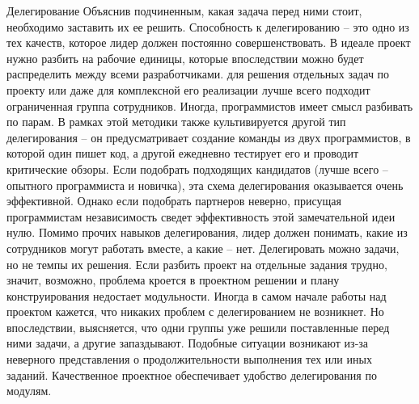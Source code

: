 \documentclass{../industrial-development}
\begin{document}
\lecturenotes Делегирование
Объяснив подчиненным, какая задача перед ними стоит, необходимо заставить их ее решить. Способность к делегированию – это одно из тех качеств, которое лидер должен постоянно совершенствовать. 
В идеале проект нужно разбить на рабочие единицы, которые впоследствии можно будет распределить между всеми разработчиками. для решения отдельных задач по проекту или даже для комплексной его реализации лучше всего подходит ограниченная группа сотрудников. Иногда, программистов имеет смысл разбивать по парам. В рамках этой методики также культивируется другой тип делегирования – он предусматривает создание команды из двух программистов, в которой один пишет код, а другой ежедневно тестирует его и проводит критические обзоры. Если подобрать подходящих кандидатов (лучше всего – опытного программиста и новичка), эта схема делегирования оказывается очень эффективной. Однако если подобрать партнеров неверно, присущая программистам независимость сведет эффективность этой замечательной идеи нулю. Помимо прочих навыков делегирования, лидер должен понимать, какие из сотрудников могут работать вместе, а какие – нет.
Делегировать можно задачи, но не темпы их решения. Если разбить проект на отдельные задания трудно, значит, возможно, проблема кроется в проектном решении и плану конструирования недостает модульности. Иногда в самом начале работы над проектом кажется, что никаких проблем с делегированием не возникнет. Но впоследствии, выясняется, что одни группы уже решили поставленные перед ними задачи, а другие запаздывают. Подобные ситуации возникают из-за неверного представления о продолжительности выполнения тех или иных заданий. Качественное проектное обеспечивает удобство делегирования по модулям.
\end{document}

